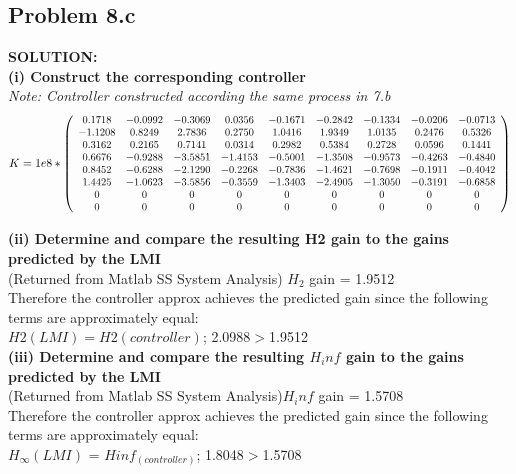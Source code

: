 \documentclass[10pt,a4paper]{article}
\newcommand\scalemath[2]{\scalebox{#1}{\mbox{\ensuremath{\displaystyle #2}}}}
\begin{document}
\subsection{Problem 8.c}
\begin{tcolorbox}
\textbf{SOLUTION:}\\
\textbf{(i) Construct the corresponding controller}\\
\textit{Note: Controller constructed according the same process in 7.b}
$$K=1e8* \left(\scalemath{0.9}{\begin{array}{ccccccccc} 
0.1718 & -0.0992 & -0.3069 & 0.0356 & -0.1671 & -0.2842 & -0.1334 & -0.0206 & -0.0713\\
-1.1208 & 0.8249 & 2.7836 & 0.2750 & 1.0416 & 1.9349 & 1.0135 & 0.2476 & 0.5326\\
0.3162 & 0.2165 & 0.7141 & 0.0314 & 0.2982 & 0.5384 & 0.2728 & 0.0596 & 0.1441\\
0.6676 & -0.9288 & -3.5851 & -1.4153 & -0.5001 & -1.3508 & -0.9573 & -0.4263 & -0.4840\\
0.8452 & -0.6288 & -2.1290 & -0.2268 & -0.7836 & -1.4621 & -0.7698 & -0.1911 & -0.4042\\
1.4425 & -1.0623 & -3.5856 & -0.3559 & -1.3403 & -2.4905 & -1.3050 & -0.3191 & -0.6858\\
0 & 0 & 0 & 0 & 0 & 0 & 0 & 0 & 0\\
0 & 0 & 0 & 0 & 0 & 0 & 0 & 0 & 0 \end{array}}\right)$$

\textbf{(ii) Determine and compare the resulting H2 gain to the gains predicted by the LMI}\\
(Returned from Matlab SS System Analysis) $H_2$ gain = 1.9512\\
    
Therefore the controller approx achieves the predicted gain since the following terms are approximately equal:\\
   $H2(LMI) = H2(controller)$;  2.0988$>$1.9512\\
   
   
\textbf{(iii) Determine and compare the resulting $H_inf$ gain to the gains predicted by the LMI}\\
(Returned from Matlab SS System Analysis)$H_inf$ gain =  1.5708\\

Therefore the controller approx achieves the predicted gain since the following terms are approximately equal:\\
   $H_\infty(LMI)$ = $Hinf_(controller)$; 1.8048$>$1.5708
   
\end{tcolorbox}
\end{document}
